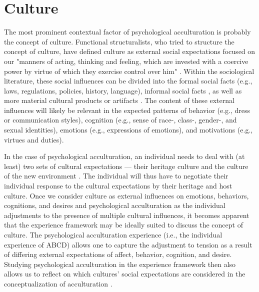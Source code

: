 \documentclass[man, 12pt, a4paper]{apa7}
\begin{document}
\section{Culture} 
The most prominent contextual factor of psychological acculturation is probably the concept of culture. Functional structuralists, who tried to structure the concept of culture, have defined culture as external social expectations focused on our "manners of acting, thinking and feeling, which are invested with a coercive power by virtue of which they exercise control over him" \citep[][p. 52; on social facts]{Durkheim1982, Gilbert1989}. Within the sociological literature, these social influences can be divided into the formal social facts (e.g., laws, regulations, policies, history, language), informal social facts \citep[e.g., norms, values, beliefs, rituals, customs; also see][]{Herzog2018}, as well as more material cultural products or artifacts \citep[e.g., food, fashion, architecture, or arts, such as film, music, literature, and fine arts; e.g., see][]{Alexander2001}. The content of these external influences will likely be relevant in the expected patterns of behavior (e.g., dress or communication styles), cognition (e.g., sense of race-, class-, gender-, and sexual identities), emotions (e.g., expressions of emotions), and motivations (e.g., virtues and duties).

In the case of psychological acculturation, an individual needs to deal with (at least) two sets of cultural expectations --- their heritage culture and the culture of the new environment \citep[e.g., see models of][]{Berry1997b, Berry2006a}. The individual will thus have to negotiate their individual response to the cultural expectations by their heritage and host culture. Once we consider culture as external influences on emotions, behaviors, cognitions, and desires and psychological acculturation as the individual adjustments to the presence of multiple cultural influences, it becomes apparent that the experience framework may be ideally suited to discuss the concept of culture. The psychological acculturation experience (i.e., the individual experience of ABCD) allows one to capture the adjustment to tension as a result of differing external expectations of affect, behavior, cognition, and desire. Studying psychological acculturation in the experience framework then also allows us to reflect on which cultures' social expectations are considered in the conceptualization of acculturation \citep{Bhatia2001}. 
\end{document}
